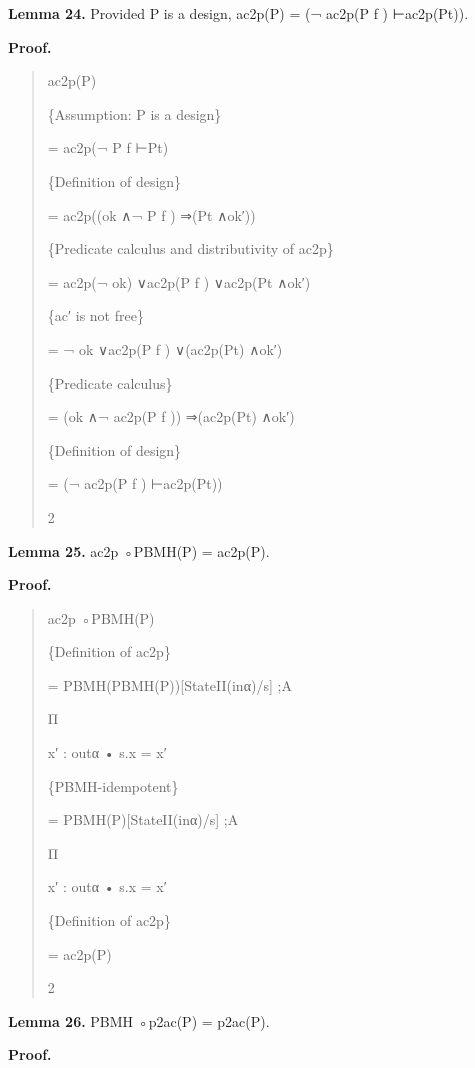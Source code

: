 \documentclass[11pt]{article}
\begin{document}
\noindent\textbf{Lemma 24.} Provided P is a design, ac2p(P) = (¬ ac2p(P f ) ⊢ac2p(Pt)).


\noindent\textbf{Proof.}


\begin{quote}\small\raggedright
ac2p(P)
\par
\{Assumption: P is a design\}
\par
= ac2p(¬ P f ⊢Pt)
\par
\{Definition of design\}
\par
= ac2p((ok ∧¬ P f ) ⇒(Pt ∧ok′))
\par
\{Predicate calculus and distributivity of ac2p\}
\par
= ac2p(¬ ok) ∨ac2p(P f ) ∨ac2p(Pt ∧ok′)
\par
\{ac′ is not free\}
\par
= ¬ ok ∨ac2p(P f ) ∨(ac2p(Pt) ∧ok′)
\par
\{Predicate calculus\}
\par
= (ok ∧¬ ac2p(P f )) ⇒(ac2p(Pt) ∧ok′)
\par
\{Definition of design\}
\par
= (¬ ac2p(P f ) ⊢ac2p(Pt))
\par
2
\end{quote}

\noindent\textbf{Lemma 25.} ac2p ◦PBMH(P) = ac2p(P).


\noindent\textbf{Proof.}


\begin{quote}\small\raggedright
ac2p ◦PBMH(P)
\par
\{Definition of ac2p\}
\par
= PBMH(PBMH(P))[StateII(inα)/s] ;A
\par
Π
\par
x′ : outα • s.x = x′
\par
\{PBMH-idempotent\}
\par
= PBMH(P)[StateII(inα)/s] ;A
\par
Π
\par
x′ : outα • s.x = x′
\par
\{Definition of ac2p\}
\par
= ac2p(P)
\par
2
\end{quote}

\noindent\textbf{Lemma 26.} PBMH ◦p2ac(P) = p2ac(P).


\noindent\textbf{Proof.}
\end{document}
